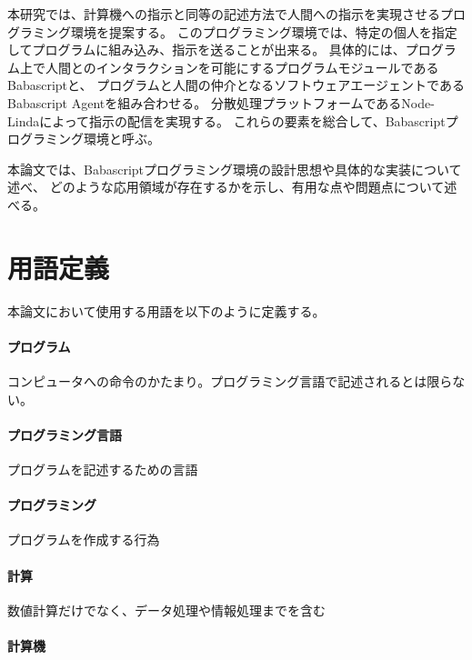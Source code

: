 本研究では、計算機への指示と同等の記述方法で人間への指示を実現させるプログラミング環境を提案する。
このプログラミング環境では、特定の個人を指定してプログラムに組み込み、指示を送ることが出来る。
具体的には、プログラム上で人間とのインタラクションを可能にするプログラムモジュールであるBabascriptと、
プログラムと人間の仲介となるソフトウェアエージェントであるBabascript
Agentを組み合わせる。
分散処理プラットフォームであるNode-Lindaによって指示の配信を実現する。
これらの要素を総合して、Babascriptプログラミング環境と呼ぶ。

本論文では、Babascriptプログラミング環境の設計思想や具体的な実装について述べ、
どのような応用領域が存在するかを示し、有用な点や問題点について述べる。

\section{用語定義}\label{ux7528ux8a9eux5b9aux7fa9}

本論文において使用する用語を以下のように定義する。

\paragraph{プログラム}\label{ux30d7ux30edux30b0ux30e9ux30e0}

コンピュータへの命令のかたまり。プログラミング言語で記述されるとは限らない。

\paragraph{プログラミング言語}\label{ux30d7ux30edux30b0ux30e9ux30dfux30f3ux30b0ux8a00ux8a9e}

プログラムを記述するための言語

\paragraph{プログラミング}\label{ux30d7ux30edux30b0ux30e9ux30dfux30f3ux30b0}

プログラムを作成する行為

\paragraph{計算}\label{ux8a08ux7b97}

数値計算だけでなく、データ処理や情報処理までを含む

\paragraph{計算機}\label{ux8a08ux7b97ux6a5f}

